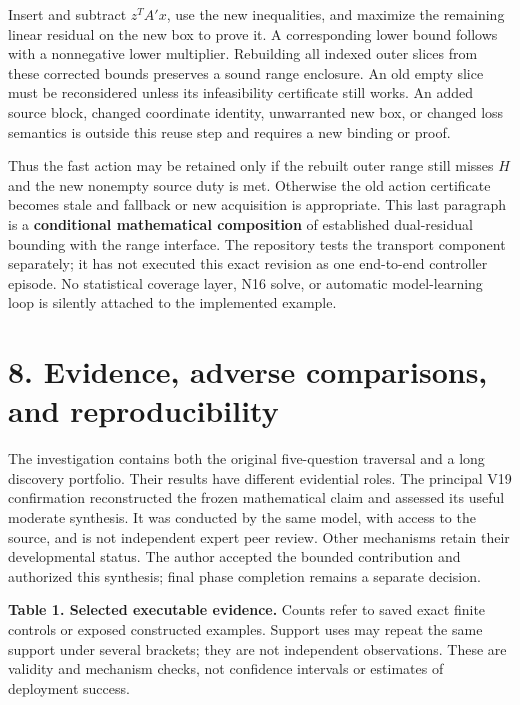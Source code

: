 \documentclass{article}
\theoremstyle{definition}
\begin{document}
Insert and subtract \(z^TA'x\), use the new inequalities, and maximize
the remaining linear residual on the new box to prove it. A
corresponding lower bound follows with a nonnegative lower multiplier.
Rebuilding all indexed outer slices from these corrected bounds
preserves a sound range enclosure. An old empty slice must be
reconsidered unless its infeasibility certificate still works. An added
source block, changed coordinate identity, unwarranted new box, or
changed loss semantics is outside this reuse step and requires a new
binding or proof.

Thus the fast action may be retained only if the rebuilt outer range
still misses \(H\) and the new nonempty source duty is met. Otherwise
the old action certificate becomes stale and fallback or new acquisition
is appropriate. This last paragraph is a \textbf{conditional
mathematical composition} of established dual-residual bounding with the
range interface. The repository tests the transport component
separately; it has not executed this exact revision as one end-to-end
controller episode. No statistical coverage layer, N16 solve, or
automatic model-learning loop is silently attached to the implemented
example.

\section{8. Evidence, adverse comparisons, and
reproducibility}\label{sec-evidence}

The investigation contains both the original five-question traversal and
a long discovery portfolio. Their results have different evidential
roles. The principal V19 confirmation reconstructed the frozen
mathematical claim and assessed its useful moderate synthesis. It was
conducted by the same model, with access to the source, and is not
independent expert peer review. Other mechanisms retain their
developmental status. The author accepted the bounded contribution and
authorized this synthesis; final phase completion remains a separate
decision.

\textbf{Table 1. Selected executable evidence.} Counts refer to saved
exact finite controls or exposed constructed examples. Support uses may
repeat the same support under several brackets; they are not independent
observations. These are validity and mechanism checks, not confidence
intervals or estimates of deployment success.
\end{document}
